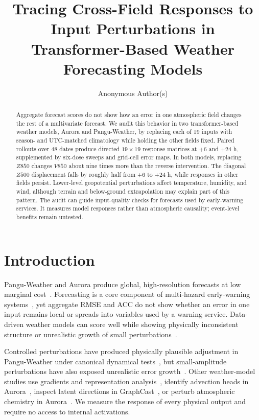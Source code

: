 \documentclass{article}
\title{Tracing Cross-Field Responses to Input Perturbations in Transformer-Based Weather Forecasting Models}
\author{Anonymous Author(s)}
\begin{document}
\maketitle

\begin{abstract}
Aggregate forecast scores do not show how an error in one atmospheric field changes the rest of a multivariate forecast. We audit this behavior in two transformer-based weather models, Aurora and Pangu-Weather, by replacing each of 19 inputs with season- and UTC-matched climatology while holding the other fields fixed. Paired rollouts over 48 dates produce directed $19\!\times\!19$ response matrices at +6 and +24 h, supplemented by six-dose sweeps and grid-cell error maps. In both models, replacing $Z850$ changes $V850$ about nine times more than the reverse intervention. The diagonal $Z500$ displacement falls by roughly half from +6 to +24 h, while responses in other fields persist. Lower-level geopotential perturbations affect temperature, humidity, and wind, although terrain and below-ground extrapolation may explain part of this pattern. The audit can guide input-quality checks for forecasts used by early-warning services. It measures model responses rather than atmospheric causality; event-level benefits remain untested.
\end{abstract}

\section{Introduction}

Pangu-Weather and Aurora produce global, high-resolution forecasts at low marginal cost~\citep{bi2023pangu,bodnar2025aurora}. Forecasting is a core component of multi-hazard early-warning systems~\citep{wmo2025earlywarning}, yet aggregate RMSE and ACC do not show whether an error in one input remains local or spreads into variables used by a warning service. Data-driven weather models can score well while showing physically inconsistent structure or unrealistic growth of small perturbations~\citep{bonavita2024limitations,selz2023butterfly}.

Controlled perturbations have produced physically plausible adjustment in Pangu-Weather under canonical dynamical tests~\citep{hakim2024dynamical}, but small-amplitude perturbations have also exposed unrealistic error growth~\citep{selz2023butterfly}. Other weather-model studies use gradients and representation analysis~\citep{yang2024survey}, identify advection heads in Aurora~\citep{macmillan2026advection}, inspect latent directions in GraphCast~\citep{tempest2026tool}, or perturb atmospheric chemistry in Aurora~\citep{hu2026chemistry}. We measure the response of every physical output and require no access to internal activations.
\end{document}
